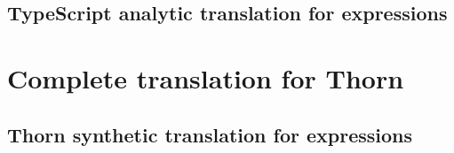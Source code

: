 \documentclass[a4paper,USenglish]{tex/lipics-v2016}
\begin{document}
\subsection{TypeScript analytic translation for expressions}


\begin{mathpar}


\end{mathpar}

\section{Complete translation for Thorn}

% 
% 
% 
% 

\subsection{Thorn synthetic translation for expressions}

\end{document}

